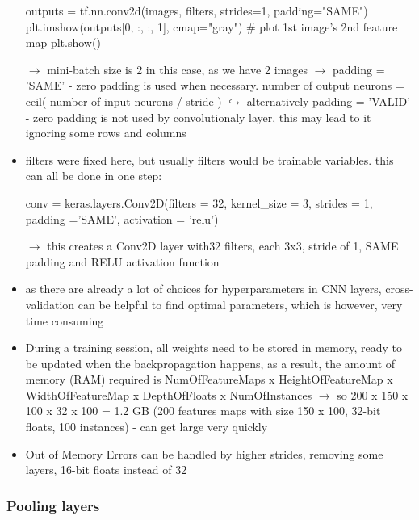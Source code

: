 \documentclass[12pt,a4paper]{article}
\begin{document}
\begin{itemize}
\begin{python}
  outputs = tf.nn.conv2d(images, filters, strides=1, padding="SAME")
  plt.imshow(outputs[0, :, :, 1], cmap="gray") # plot 1st image's 2nd feature map
  plt.show()
  \end{python}
  \indent $\longrightarrow$ mini-batch size is 2 in this case, as we have 2 images
  \newline \indent $\longrightarrow$ padding = 'SAME' - zero padding is used when necessary. number of output neurons = ceil( number of input neurons / stride )
  \newline \indent $\hookrightarrow$ alternatively padding = 'VALID' - zero padding is not used by convolutionaly layer, this may lead to it ignoring some rows and columns
  \item filters were fixed here, but usually filters would be trainable variables. this can all be done in one step:
  \begin{python}
     conv = keras.layers.Conv2D(filters = 32, kernel_size = 3, strides = 1, padding ='SAME', activation = 'relu')
   \end{python} 
   \indent $\longrightarrow$ this creates a Conv2D layer with32 filters, each 3x3, stride of 1, SAME padding and RELU activation function
   \item as there are already a lot of choices for hyperparameters in CNN layers, cross-validation can be helpful to find optimal parameters, which is however, very time consuming
   \item During a training session, all weights need to be stored in memory, ready to be updated when the backpropagation happens, as a result, the amount of memory (RAM) required is NumOfFeatureMaps x HeightOfFeatureMap x WidthOfFeatureMap x DepthOfFloats x NumOfInstances
   \newline \indent $\longrightarrow$ so 200 x 150 x 100 x 32 x 100 = 1.2 GB (200 features maps with size 150 x 100, 32-bit floats, 100 instances) - can get large very quickly
   \item Out of Memory Errors can be handled by higher strides, removing some layers, 16-bit floats instead of 32
\end{itemize}

\subsubsection{Pooling layers} %
\label{ssub:pooling_layers}
\end{document}
